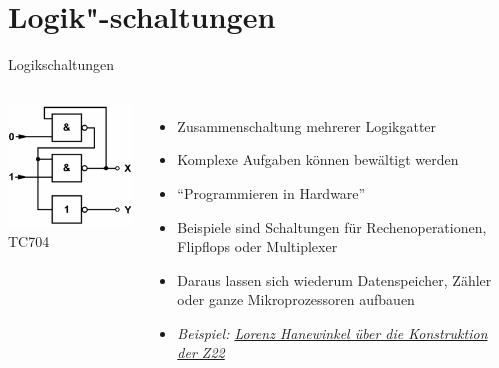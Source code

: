 \section{Logik"-schaltungen}
\begin{frame}{Logikschaltungen}
  \begin{columns}
    \includegraphics[width=\textwidth,height=.8\textheight,keepaspectratio]{a14/tc704.png}\\
    {\tiny TC704 \hyperlink{refs}{\cite{bna}}}
    \begin{itemize}
      \item Zusammenschaltung mehrerer Logikgatter
      \item Komplexe Aufgaben können bewältigt werden
      \item ``Programmieren in Hardware''
      \item Beispiele sind Schaltungen für Rechenoperationen, Flipflops oder Multiplexer
      \item Daraus lassen sich wiederum Datenspeicher, Zähler oder ganze Mikroprozessoren aufbauen
      \item \emph{Beispiel: \href{https://media.ccc.de/v/gpn14_-_5862_-__-_medientheater_-_201406211600_-_zuse_z22_-_lorenz_hanewinkel}{\PointingHand Lorenz Hanewinkel über die Konstruktion der Z22}}
    \end{itemize}
  \end{columns}
\end{frame}


